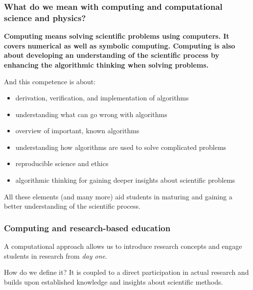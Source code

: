 \documentclass{beamer}
\begin{document}
\begin{frame}
\frametitle{What do we mean with computing and computational science and physics?}

\begin{block}{}

\textbf{Computing means solving scientific problems using computers. It covers numerical as well as symbolic computing. Computing is also about developing an understanding of the scientific process by enhancing the algorithmic thinking when solving problems.}

And this  competence is about:

\begin{itemize}
\item derivation, verification, and implementation of algorithms

\item understanding what can go wrong with algorithms

\item overview of important, known algorithms

\item understanding how algorithms are used to solve complicated problems

\item reproducible science and ethics

\item algorithmic thinking for gaining deeper insights about scientific problems
\end{itemize}

\noindent
All these elements (and many more) aid students in maturing and gaining a better understanding of the scientific process.  
\end{block}
\end{frame}

\begin{frame}
\frametitle{Computing and research-based education}

\begin{block}{}
A computational approach allows us to introduce research concepts and engage students in research from \emph{day one}.
\end{block}
\begin{block}{How do we define it? }
It is coupled to a direct participation in actual research and builds upon established
knowledge and insights about scientific methods.
\end{block}
\end{frame}
\end{document}
